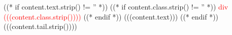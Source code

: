 ((* if content.text.strip() != '' *))
((* if content.class.strip() != '' *)) \textcolor{red}{div (((content.class.strip())))} ((* endif *))
(((content.text)))
((* endif *))
(((content.tail.strip())))
